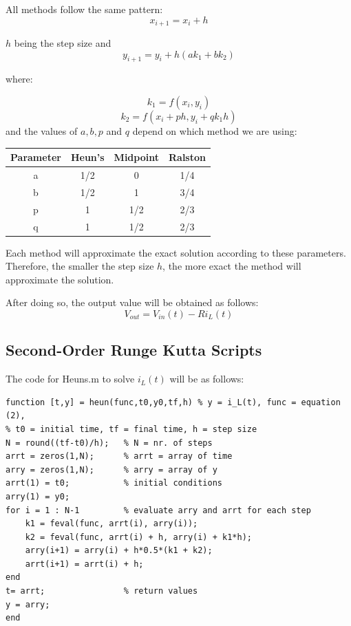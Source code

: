 \documentclass[11pt,a4paper]{article}
\begin{document}
All methods follow the same pattern:
\begin{equation}
x_{i+1} = x_i + h
\end{equation}

$h$ being the step size and
\begin{equation}
   y_{i+1} = y_i + h (a k_1 + b k_2)
\end{equation}

where:

\begin{equation}
k_1 = f(x_i, y_i)
\end{equation}
\begin{equation}
k_2 = f(x_i + p h, y_i + q k_1 h)
\end{equation}
and the values of $a, b, p$ and $q$ depend on which method we are using:

\begin{center}
 \begin{tabular}{||c | c c c||}
 \hline
 Parameter & Heun’s & Midpoint & Ralston \\ [0.5ex]
 \hline\hline
 a & 1/2 & 0 & 1/4 \\
 \hline
 b & 1/2 & 1 & 3/4 \\
 \hline
 p & 1 & 1/2 & 2/3 \\
 \hline
 q & 1 & 1/2 & 2/3 \\ [1ex]
 \hline
\end{tabular}
\end{center}

Each method will approximate the exact solution according to these parameters. Therefore, the smaller the step size $h$, the more exact the method will approximate the solution.

 After doing so, the output value will be obtained as follows:
\begin{equation}
V_{out} = V_{in}(t) - R i_L(t)
\end{equation}

\newpage

\subsection{Second-Order Runge Kutta Scripts}

\vspace{-2mm}The code for Heuns.m to solve $i_L(t)$ will be as follows:

\begin{verbatim}
function [t,y] = heun(func,t0,y0,tf,h) % y = i_L(t), func = equation (2),
% t0 = initial time, tf = final time, h = step size
N = round((tf-t0)/h);   % N = nr. of steps
arrt = zeros(1,N);      % arrt = array of time
arry = zeros(1,N);      % arry = array of y
arrt(1) = t0;           % initial conditions
arry(1) = y0;
for i = 1 : N-1         % evaluate arry and arrt for each step
    k1 = feval(func, arrt(i), arry(i));
    k2 = feval(func, arrt(i) + h, arry(i) + k1*h);
    arry(i+1) = arry(i) + h*0.5*(k1 + k2);
    arrt(i+1) = arrt(i) + h;
end
t= arrt;                % return values
y = arry;
end
\end{verbatim}
\end{document}
